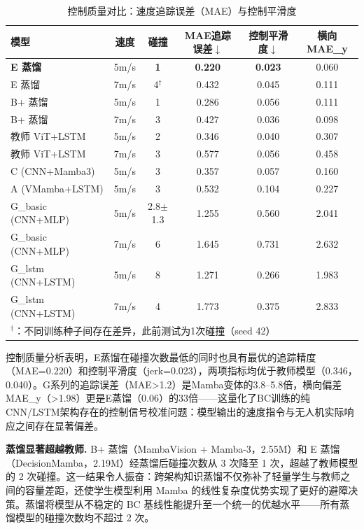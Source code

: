 \documentclass[12pt,a4paper]{article}
\numberwithin{equation}{section}
\numberwithin{figure}{section}
\numberwithin{table}{section}
\begin{document}
\begin{table}[H]
\centering
\caption{控制质量对比：速度追踪误差（MAE）与控制平滑度}
\label{tab:tracking}
\begin{tabular}{lccccc}
\toprule
模型 & 速度 & 碰撞 & MAE追踪误差$\downarrow$ & 控制平滑度$\downarrow$ & 横向MAE\_y \\
\midrule
\textbf{E 蒸馏} & 5m/s & \textbf{1} & \textbf{0.220} & \textbf{0.023} & 0.060 \\
E 蒸馏 & 7m/s & 4$^\dagger$ & 0.432 & 0.045 & 0.111 \\
B+ 蒸馏 & 5m/s & 1 & 0.286 & 0.056 & 0.111 \\
B+ 蒸馏 & 7m/s & 3 & 0.427 & 0.036 & 0.098 \\
教师 ViT+LSTM & 5m/s & 2 & 0.346 & 0.040 & 0.307 \\
教师 ViT+LSTM & 7m/s & 3 & 0.577 & 0.056 & 0.458 \\
C (CNN+Mamba3) & 5m/s & 3 & 0.357 & 0.057 & 0.160 \\
A (VMamba+LSTM) & 5m/s & 3 & 0.532 & 0.104 & 0.227 \\
G\_basic (CNN+MLP) & 5m/s & 2.8$\pm$1.3 & 1.255 & 0.560 & 2.041 \\
G\_basic (CNN+MLP) & 7m/s & 6 & 1.645 & 0.731 & 2.632 \\
G\_lstm (CNN+LSTM) & 5m/s & 8 & 1.271 & 0.266 & 1.983 \\
G\_lstm (CNN+LSTM) & 7m/s & 4 & 1.773 & 0.375 & 2.833 \\
\bottomrule
\multicolumn{6}{l}{$^\dagger$：不同训练种子间存在差异，此前测试为1次碰撞（seed 42）} \\
\end{tabular}
\end{table}

控制质量分析表明，E蒸馏在碰撞次数最低的同时也具有最优的追踪精度（MAE=0.220）和控制平滑度（jerk=0.023），两项指标均优于教师模型（0.346，0.040）。G系列的追踪误差（MAE>1.2）是Mamba变体的3.8--5.8倍，横向偏差MAE\_y（>1.98）更是E蒸馏（0.06）的33倍——这量化了BC训练的纯CNN/LSTM架构存在的控制信号校准问题：模型输出的速度指令与无人机实际响应之间存在显著偏差。

\textbf{蒸馏显著超越教师.} B+ 蒸馏（MambaVision + Mamba-3，2.55M）和 E 蒸馏（DecisionMamba，2.19M）经蒸馏后碰撞次数从 3 次降至 1 次，超越了教师模型的 2 次碰撞。这一结果令人振奋：跨架构知识蒸馏不仅弥补了轻量学生与教师之间的容量差距，还使学生模型利用 Mamba 的线性复杂度优势实现了更好的避障决策。蒸馏将模型从不稳定的 BC 基线性能提升至一个统一的优越水平——所有蒸馏模型的碰撞次数均不超过 2 次。
\end{document}
